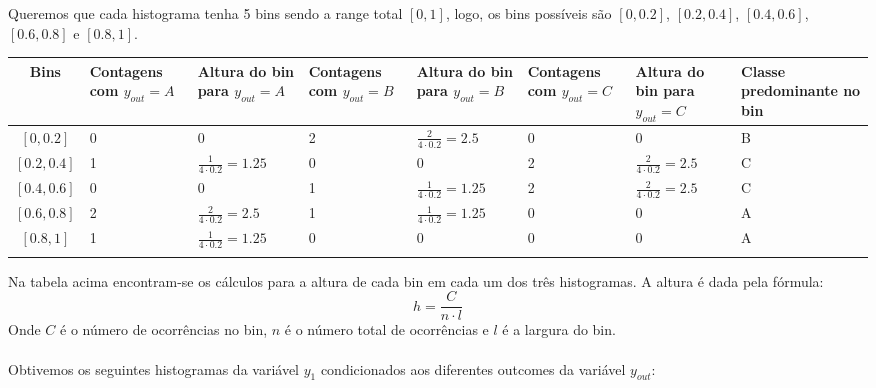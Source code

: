 \documentclass{article}
\begin{document}
Queremos que cada histograma tenha 5 bins sendo a range total $[0,1]$, logo, os bins possíveis são $[0, 0.2]$, $[0.2, 0.4]$, $[0.4, 0.6]$, $[0.6, 0.8]$ e $[0.8, 1]$.


\begin{table}[H]
  \centering
  \begin{tabular}{|c|w{1.8cm}|w{1.8cm}|w{1.8cm}|w{1.8cm}|w{1.8cm}|w{1.8cm}|w{1.8cm}|}
    \hline
    Bins & Contagens com $y_{out} = A$ & Altura do bin para $y_{out} = A$ & Contagens com $y_{out} = B$ & Altura do bin para $y_{out} = B$ & Contagens com $y_{out} = C$ & Altura do bin para $y_{out} = C$ & Classe predominante no bin \\ \hline
    $[0,0.2]$       &  0             & 0                              & 2 & $\frac{2}{4\cdot 0.2} = 2.5$    & 0 & 0                   & B \\ \hline
    $[0.2,0.4]$     &  1             & $\frac{1}{4 \cdot 0.2} = 1.25$ & 0 & 0                               & 2 & $\frac{2}{4\cdot 0.2} = 2.5$ & C \\ \hline
    $[0.4,0.6]$     &  0             & 0                              & 1 & $\frac{1}{4\cdot 0.2} = 1.25$   & 2 & $\frac{2}{4\cdot 0.2} = 2.5$ & C \\ \hline
    $[0.6,0.8]$     &  2             & $\frac{2}{4\cdot 0.2}=2.5$     & 1 & $\frac{1}{4\cdot 0.2} = 1.25$   & 0 & 0                   & A \\ \hline
    $[0.8,1]$       &  1             & $\frac{1}{4\cdot 0.2} = 1.25$  & 0 & 0                               & 0 & 0                   & A \\ \hline
    \label{tab:c_bins}
  \end{tabular}
\end{table}

Na tabela acima encontram-se os cálculos para a altura de cada bin em cada um dos três histogramas. 
A altura é dada pela fórmula:
\[ h = \frac{C}{n\cdot l} \]
Onde $C$ é o número de ocorrências no bin, $n$ é o número total de ocorrências e $l$ é a largura do bin.

\paragraph{}

Obtivemos os seguintes histogramas da variável $y_1$ condicionados aos diferentes outcomes da variável $y_{out}$:
\end{document}
